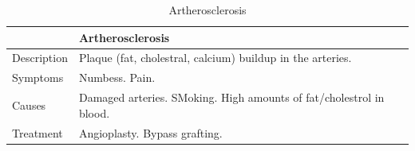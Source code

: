 \documentclass[12pt]{report}
\begin{document}
    \begin{table}
    \renewcommand{\arraystretch}{1.5}
    \setlength{\tabcolsep}{10pt}
    \setlength{\arrayrulewidth}{0.25mm}
        \begin{center}
            \vspace{0.5em}
            \begin{tabular}{|l|l|}
            \hline
             & Artherosclerosis \\ 
            \hline
            Description & Plaque (fat, cholestral, calcium) buildup in the arteries. \\
            \hline
            Symptoms & Numbess. Pain.\\ 
            \hline 
            Causes & Damaged arteries. SMoking. High amounts of fat/cholestrol in blood.\\
            \hline
            Treatment & Angioplasty. Bypass grafting.\\
            \hline
            \end{tabular}
        \end{center}
        \caption{Artherosclerosis}
    \end{table}
\end{document}
